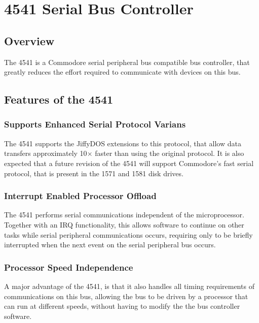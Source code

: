 \chapter{4541 Serial Bus Controller}

\section{Overview}

The 4541 is a Commodore{\texttrademark} serial peripheral bus compatible
bus controller, that greatly reduces the effort required to
communicate with devices on this bus.

\section{Features of the 4541}

\subsection{Supports Enhanced Serial Protocol Varians}

The 4541 supports the
JiffyDOS{\texttrademark} extensions to this protocol, that allow data
transfers approximately 10$\times$ faster than using the original
protocol. It is also expected that a future revision of the 4541 will
support Commodore's fast serial protocol, that is present in the 1571
and 1581 disk drives. 

\subsection{Interrupt Enabled Processor Offload}

The 4541 performs serial communications independent of the
microprocessor. Together with an IRQ functionality, this allows
software to continue on other tasks while serial peripheral
communications occurs, requiring only to be briefly interrupted when
the next event on the serial peripheral bus occurs.

\subsection{Processor Speed Independence}

A major advantage of the 4541, is that it also handles all timing
requirements of communications on this bus, allowing the bus to be
driven by a processor that can run at different speeds, without having
to modify the the bus controller software.

